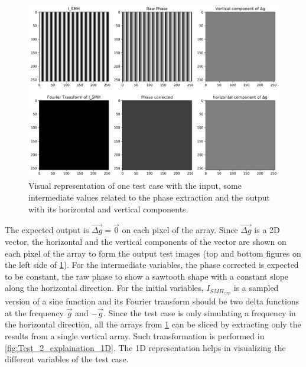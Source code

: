 \documentclass[12pt, titlepage]{article}
\begin{document}
\begin{figure}[H]
\begin{center}
\includegraphics[scale=0.5]{Figures/Test_2_explanation.png}
\caption{Visual representation of one test case with the input, some intermediate values related to the phase extraction and the output with its horizontal and vertical components.}
\label{fig:Test_2_explanation}
\end{center}
\end{figure}

The expected output is $\overrightarrow{\Delta g} = \overrightarrow{0}$ on each pixel of the array. Since $\overrightarrow{\Delta g}$ is a 2D vector, the horizontal and the vertical components of the vector are shown on each pixel of the array to form the output test images (top and bottom figures on the left side of \cref{fig:Test_2_explanation}). For the intermediate variables, the phase corrected is expected to be constant, the raw phase to show a sawtooth shape with a constant slope along the horizontal direction. For the initial variables, $I_{SMH_{exp}}$ is a sampled version of a sine function and its Fourier transform should be two delta functions at the frequency $\overrightarrow{g}$ and $-\overrightarrow{g}$. Since the test case is only simulating a frequency in the horizontal direction, all the arrays from \cref{fig:Test_2_explanation} can be sliced by extracting only the results from a single vertical array. Such transformation is performed in \cref{fig:Test_2_explaination_1D}. The 1D representation helps in visualizing the different variables of the test case. 
\end{document}
